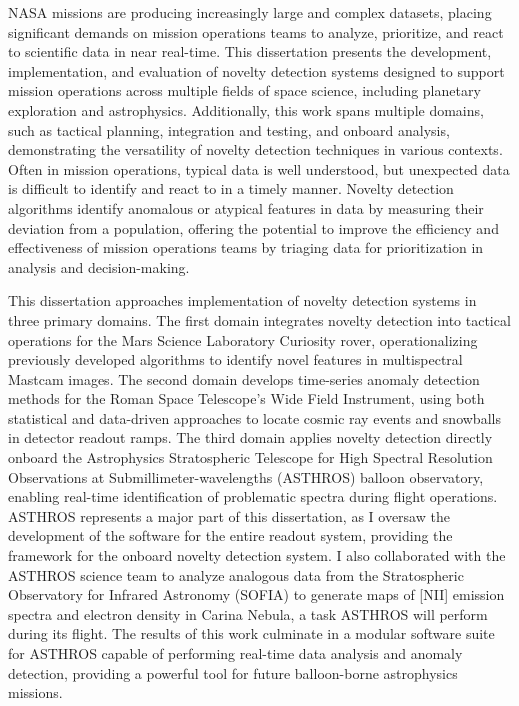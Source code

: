 NASA missions are producing increasingly large and complex datasets, placing significant demands on mission operations teams to analyze, prioritize, and react to scientific data in near real-time.
This dissertation presents the development, implementation, and evaluation of novelty detection systems designed to support mission operations across multiple fields of space science, including planetary exploration and astrophysics.
Additionally, this work spans multiple domains, such as tactical planning, integration and testing, and onboard analysis, demonstrating the versatility of novelty detection techniques in various contexts.
Often in mission operations, typical data is well understood, but unexpected data is difficult to identify and react to in a timely manner.
Novelty detection algorithms identify anomalous or atypical features in data by measuring their deviation from a population, offering the potential to improve the efficiency and effectiveness of mission operations teams by triaging data for prioritization in analysis and decision-making.

This dissertation approaches implementation of novelty detection systems in three primary domains.
The first domain integrates novelty detection into tactical operations for the Mars Science Laboratory Curiosity rover, operationalizing previously developed algorithms to identify novel features in multispectral Mastcam images.
The second domain develops time-series anomaly detection methods for the Roman Space Telescope's Wide Field Instrument, using both statistical and data-driven approaches to locate cosmic ray events and snowballs in detector readout ramps.
The third domain applies novelty detection directly onboard the Astrophysics Stratospheric Telescope for High Spectral Resolution Observations at Submillimeter-wavelengths (ASTHROS) balloon observatory, enabling real-time identification of problematic spectra during flight operations.
ASTHROS represents a major part of this dissertation, as I oversaw the development of the software for the entire readout system, providing the framework for the onboard novelty detection system.
I also collaborated with the ASTHROS science team to analyze analogous data from the Stratospheric Observatory for Infrared Astronomy (SOFIA) to generate maps of [NII] emission spectra and electron density in Carina Nebula, a task ASTHROS will perform during its flight.
The results of this work culminate in a modular software suite for ASTHROS capable of performing real-time data analysis and anomaly detection, providing a powerful tool for future balloon-borne astrophysics missions.